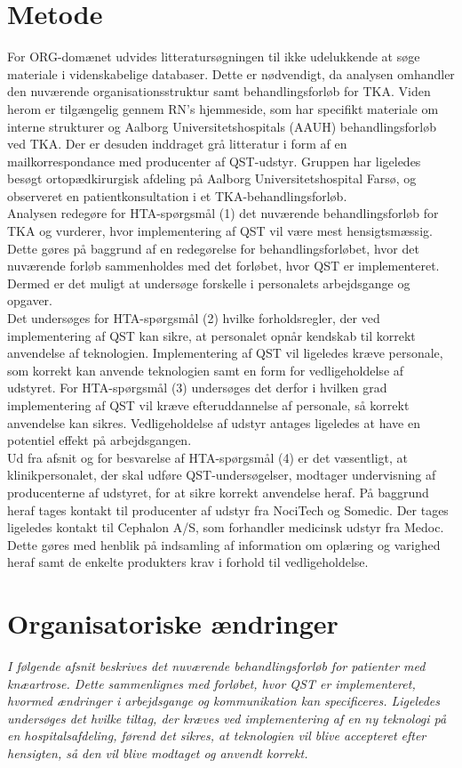 \section{Metode}
For ORG-domænet udvides litteratursøgningen til ikke udelukkende at søge materiale i videnskabelige databaser. Dette er nødvendigt, da analysen omhandler den nuværende organisationsstruktur samt behandlingsforløb for TKA. Viden herom er tilgængelig gennem RN’s hjemmeside, som har specifikt materiale om interne strukturer og Aalborg Universitetshospitals (AAUH) behandlingsforløb ved TKA. Der er desuden inddraget grå litteratur i form af en mailkorrespondance med producenter af QST-udstyr. Gruppen har ligeledes besøgt ortopædkirurgisk afdeling på Aalborg Universitetshospital Farsø, og observeret en patientkonsultation i et TKA-behandlingsforløb. \\
Analysen redegøre for HTA-spørgsmål (1) det nuværende behandlingsforløb for TKA og vurderer, hvor implementering af QST vil være mest hensigtsmæssig. Dette gøres på baggrund af en redegørelse for behandlingsforløbet, hvor det nuværende forløb sammenholdes med det forløbet, hvor QST er implementeret. Dermed er det muligt at undersøge forskelle i personalets arbejdsgange og opgaver. \\
Det undersøges for HTA-spørgsmål (2) hvilke forholdsregler, der ved implementering af QST kan sikre, at personalet opnår kendskab til korrekt anvendelse af teknologien.
Implementering af QST vil ligeledes kræve personale, som korrekt kan anvende teknologien samt en form for vedligeholdelse af udstyret. For HTA-spørgsmål (3) undersøges det derfor i hvilken grad implementering af QST vil kræve efteruddannelse af personale, så korrekt anvendelse kan sikres. Vedligeholdelse af udstyr antages ligeledes at have en potentiel effekt på arbejdsgangen. \\
Ud fra afsnit  og for besvarelse af HTA-spørgsmål (4) er det væsentligt, at klinikpersonalet, der skal udføre QST-undersøgelser, modtager undervisning af producenterne af udstyret, for at sikre korrekt anvendelse heraf. På baggrund heraf tages kontakt til producenter af udstyr fra NociTech og Somedic. Der tages ligeledes kontakt til Cephalon A/S, som forhandler medicinsk udstyr fra Medoc. Dette gøres med henblik på indsamling af information om oplæring og varighed heraf samt de enkelte produkters krav i forhold til vedligeholdelse.


\section{Organisatoriske ændringer}
\textit{I følgende afsnit beskrives det nuværende behandlingsforløb for patienter med knæartrose. Dette sammenlignes med forløbet, hvor QST er implementeret, hvormed ændringer i arbejdsgange og kommunikation kan specificeres. Ligeledes undersøges det hvilke tiltag, der kræves ved implementering af en ny teknologi på en hospitalsafdeling, førend det sikres, at teknologien vil blive accepteret efter hensigten, så den vil blive modtaget og anvendt korrekt.}


